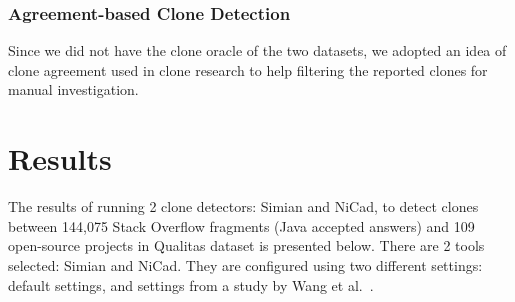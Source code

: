 \documentclass{sig-alternate-05-2015}
\begin{document}
\subsubsection{Agreement-based Clone Detection}
Since we did not have the clone oracle of the two datasets, we adopted an idea of clone agreement used in clone research \cite{Wang2013,Funaro2010} to help filtering the reported clones for manual investigation.

\section{Results}
The results of running 2 clone detectors: Simian and NiCad, to detect clones between 144,075 Stack Overflow fragments (Java accepted answers) and 109 open-source projects in Qualitas dataset is presented below. There are 2 tools selected: Simian and NiCad. They are configured using two different settings: default settings, and settings from a study by Wang et al.~\cite{Wang2013}. %
\end{document}
